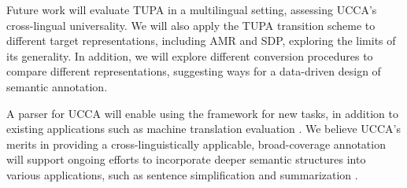 \documentclass[11pt,a4paper]{article}
\newcommand{\parser}[1]{TUPA\textsubscript{#1}}
\begin{document}
Future work will evaluate \parser{} in a multilingual setting,
assessing UCCA's cross-lingual universality.
We will also apply the \parser{} transition scheme to different target
representations, including AMR and SDP, exploring the limits of its generality.
In addition, we will explore different conversion procedures \cite{kong-15}
to compare different representations,
suggesting ways for a data-driven design of semantic annotation.

A parser for UCCA will enable using the framework for new tasks,
in addition to existing applications such as machine translation
evaluation \cite{birch2016hume}.
We believe UCCA's merits in providing a cross-linguistically applicable,
broad-coverage annotation will support ongoing efforts to incorporate deeper
semantic structures into various applications,
such as sentence simplification \cite{narayan2014hybrid} and summarization \cite{liu2015toward}.



\end{document}

